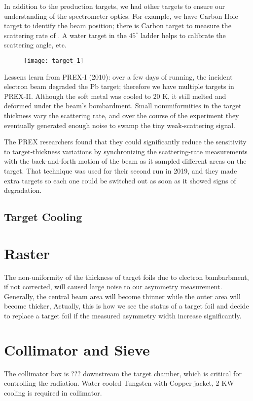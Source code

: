 In addition to the production targets, we had other targets to ensure our 
understanding of the spectrometer optics. For example, we have Carbon Hole target
to identify the beam position; there is Carbon target to measure the scattering
rate of \C. A water target in the $45^\circ$ ladder helps to calibrate the 
scattering angle, etc.

\begin{figure}[h!]
    \centering
    \texttt{[image: target\_1]}
\end{figure}

Lessens learn from PREX-I (2010): over a few days of running, the incident
electron beam degraded the Pb target; therefore we have multiple targets in
PREX-II. Although the soft metal was cooled to 20 K, it still melted and 
deformed under the beam's bombardment. Small nonuniformities in the target 
thickness vary the scattering rate, and over the course of the experiment they 
eventually generated enough noise to swamp the tiny weak-scattering signal.

The PREX researchers found that they could significantly reduce the sensitivity 
to target-thickness variations by synchronizing the scattering-rate measurements 
with the back-and-forth motion of the beam as it sampled different areas on the target. 
That technique was used for their second run in 2019, and they made extra targets 
so each one could be switched out as soon as it showed signs of degradation.

\subsection{Target Cooling}

\section{Raster}
The non-uniformity of the thickness of target foils due to electron bambarbment, 
if not corrected, will caused large noise to our asymmetry measurement. 
Generally, the central beam area will become thinner while the outer area will 
become thicker, Actually, this is how we see the status of a target foil and decide
to replace a target foil if the measured asymmetry width increase significantly.

\section{Collimator and Sieve}
The collimator box is ??? downstream the target chamber, which is critical for
controlling the radiation. Water cooled Tungsten with Copper jacket, 2 KW cooling
is required in collimator.


